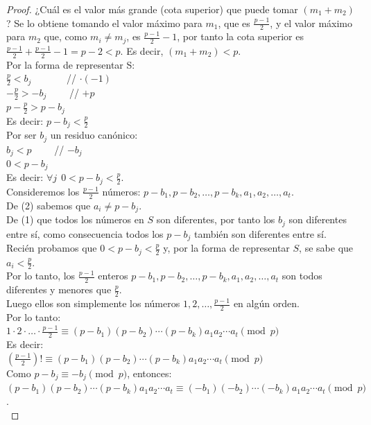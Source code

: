 \begin{proof}
¿Cuál es el valor más grande (cota superior) que puede tomar $(m_{1}+m_{2})$? Se lo obtiene tomando el valor máximo para $m_{1}$, que es $\frac{p-1}{2}$, y el valor máximo para $m_{2}$ que, como $m_{i} \ne m_{j}$, es $\frac{p-1}{2} - 1$, por tanto la cota superior es $\frac{p-1}{2} + \frac{p-1}{2} - 1 = p-2 < p$. Es decir, $(m_{1}+m_{2}) < p$. \\
Por la forma de representar S: \\
$\frac{p}{2} < b_{j} \qquad \quad \;$ // $\cdot (-1)$ \\
$- \frac{p}{2} > -b_{j} \qquad$ // $+ p$ \\
$p - \frac{p}{2} > p-b_{j}$ \\
Es decir: $p-b_{j} < \frac{p}{2}$ \\
Por ser $b_j$ un residuo canónico: \\
$b_j < p \qquad$ // $- b_j$ \\
$0 < p - b_j$ \\
Es decir: $\forall j \;\, 0 < p-b_{j} < \frac{p}{2}$. \\
Consideremos los $\frac{p-1}{2}$ números: $p-b_{1}, p-b_{2}, \dots, p-b_{k}, a_{1}, a_{2}, \dots, a_{t}$. \\
De (2) sabemos que $a_{i} \ne p-b_{j}$. \\
De (1) que todos los números en $S$ son diferentes, por tanto los $b_j$ son diferentes entre sí, como consecuencia todos los $p-b_j$ también son diferentes entre sí. \\
Recién probamos que $0 < p-b_{j} < \frac{p}{2}$ y, por la forma de representar $S$, se sabe que $a_{i} < \frac{p}{2}$. \\
Por lo tanto, los $\frac{p-1}{2}$ enteros $p-b_{1}, p-b_{2}, \dots, p-b_{k}, a_{1}, a_{2}, \dots, a_{t}$ son todos diferentes y menores que $\frac{p}{2}$. \\
Luego ellos son simplemente los números $1, 2, \dots, \frac{p-1}{2}$ en algún orden. \\
Por lo tanto: \\
$1 \cdot 2 \cdot \ldots \cdot \frac{p-1}{2} \equiv (p-b_{1})(p-b_{2})\cdots(p-b_{k})a_{1}a_{2}\cdots a_{t} \pmod{p}$ \\
Es decir: \\
$\left(\frac{p-1}{2}\right)! \equiv (p-b_{1})(p-b_{2})\cdots(p-b_{k})a_{1}a_{2}\cdots a_{t} \pmod{p}$ \\
Como $ p-b_{j} \equiv -b_{j} \pmod{p}$, entonces: \\
$(p-b_{1})(p-b_{2})\cdots(p-b_{k})a_{1}a_{2}\cdots a_{t} \equiv (-b_{1})(-b_{2})\cdots(-b_{k})a_{1}a_{2}\cdots a_{t} \pmod p$. \\

\end{proof}
